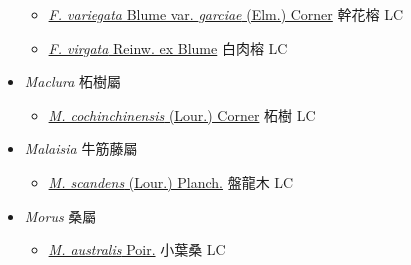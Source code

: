 \begin{itemize}
\begin{itemize}
        \item[] \href{http://www.theplantlist.org/tpl1.1/search?q=Ficus+variegata+var.+garciae}{\textit{F. variegata} Blume var. \textit{garciae} (Elm.) Corner}   幹花榕 LC
        \item[] \href{http://www.theplantlist.org/tpl1.1/search?q=Ficus+virgata}{\textit{F. virgata} Reinw. ex Blume}   白肉榕 LC
  \end{itemize}
 \item[] \textit{Maclura} 柘樹屬
                    
  \begin{itemize}
        \item[] \href{http://www.theplantlist.org/tpl1.1/search?q=Maclura+cochinchinensis}{\textit{M. cochinchinensis} (Lour.) Corner}   柘樹 LC
  \end{itemize}
 \item[] \textit{Malaisia} 牛筋藤屬
                    
  \begin{itemize}
        \item[] \href{http://www.theplantlist.org/tpl1.1/search?q=Malaisia+scandens}{\textit{M. scandens} (Lour.) Planch.}   盤龍木 LC
  \end{itemize}
 \item[] \textit{Morus} 桑屬
                    
  \begin{itemize}
        \item[] \href{http://www.theplantlist.org/tpl1.1/search?q=Morus+australis}{\textit{M. australis} Poir.}   小葉桑 LC
  \end{itemize}
  \end{itemize}
